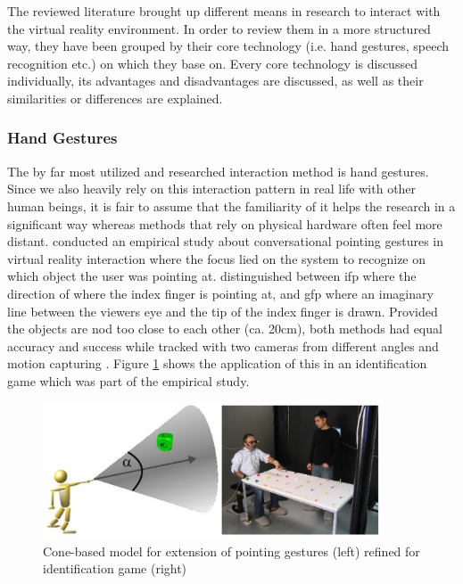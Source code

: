 The reviewed literature brought up different means in research to interact with the virtual reality environment. In order to review them in a more structured way, they have been grouped by their core technology (i.e. hand gestures, speech recognition etc.) on which they base on. Every core technology is discussed individually, its advantages and disadvantages are discussed, as well as their similarities or differences are explained.


\subsubsection{Hand Gestures}

\label{SubSubSectionHandGestures}

The by far most utilized and researched interaction method is hand gestures. Since we also heavily rely on this interaction pattern in real life with other human beings, it is fair to assume that the familiarity of it helps the research in a significant way whereas methods that rely on physical hardware often feel more distant. \newline
\cite{Pfeiffer2008} conducted an empirical study about conversational pointing gestures in virtual reality interaction where the focus lied on the system to recognize on which object the user was pointing at. \cite{Pfeiffer2008} distinguished between \gls{ifp} where the direction of where the index finger is pointing at, and \gls{gfp} where an imaginary line between the viewers eye and the tip of the index finger is drawn. Provided the objects are nod too close to each other (ca. 20cm), both methods had equal accuracy and success while tracked with two cameras from different angles and motion capturing \citep{Pfeiffer2008}. Figure \ref{fig:pointinggesture} shows the application of this in an identification game which was part of the empirical study.
\begin{figure}[h]
	\begin{center}
		\includegraphics[width=10cm]{03_Figures/05_LitReview/Pfeiffer2008_Pointing.png}
		\caption[Cone-based model for extension of pointing gestures refined for identification game]{Cone-based model for extension of pointing gestures (left) refined for identification game (right) \citep{Pfeiffer2008}}
		\label{fig:pointinggesture}
	\end{center}
\end{figure}
